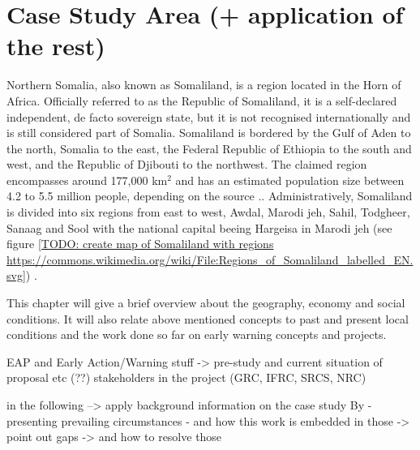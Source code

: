 {\section{Case Study Area (+ application of the rest)} %

Northern Somalia, also known as Somaliland, is a region located in the Horn of Africa. Officially referred to as the Republic of Somaliland, it is a self-declared independent, de facto sovereign state, but it is not recognised internationally and is still considered part of Somalia. Somaliland is bordered by the Gulf of Aden to the north, Somalia to the east, the Federal Republic of Ethiopia to the south and west, and the Republic of Djibouti to the northwest. The claimed region encompasses around 177,000 km$^2$ and has an estimated population size between 4.2 to 5.5 million people, depending on the source \autocite{petrucciLandscapeLandformsNorthern2022,republicofsomaliaCountryProfile20212021,somaliredcrescentsocietyFeasibilityStudyPotential2022}.. Administratively, Somaliland is divided into six regions from east to west, Awdal, Marodi jeh, Sahil, Todgheer, Sanaag and Sool with the national capital beeing Hargeisa in Marodi jeh (see figure \ref*{TODO: create map of Somaliland with regions https://commons.wikimedia.org/wiki/File:Regions_of_Somaliland_labelled_EN.svg}) \autocite{republicofsomaliaCountryProfile20212021}.


This chapter will give a brief overview about the geography, economy and social conditions. It will also relate above mentioned concepts to past and present local conditions and the work done so far on early warning concepts and projects. %




EAP and Early Action/Warning stuff -> pre-study and current situation of proposal etc (??)
stakeholders in the project (GRC, IFRC, SRCS, NRC)

in the following
--> apply background information on the case study By
    - presenting prevailing circumstances
    - and how this work is embedded in those
    -> point out gaps
    -> and how to resolve those

}
